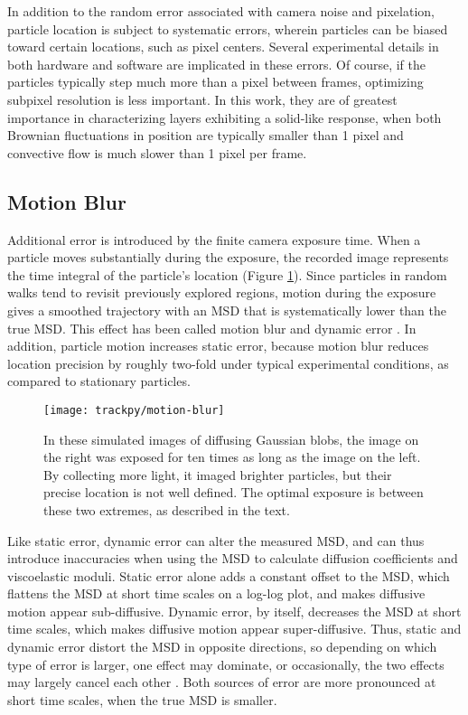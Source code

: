 In addition to the random error associated with camera noise and pixelation, particle location is subject to systematic errors, wherein particles can be biased toward certain locations, such as pixel centers. Several experimental details in both hardware and software are implicated in these errors\cite{Crocker2007}. Of course, if the particles typically step much more than a pixel between frames, optimizing subpixel resolution is less important. In this work, they are of greatest importance in characterizing layers exhibiting a solid-like response, when both Brownian fluctuations in position are typically smaller than 1 pixel and convective flow is much slower than 1 pixel per frame.

\subsection{Motion Blur}

Additional error is introduced by the finite  camera exposure time. When a particle moves substantially during the exposure, the recorded image represents the time integral of the particle's location (Figure \ref{fig:motion-blur}). Since particles in random walks tend to revisit previously explored regions, motion during the exposure gives a smoothed trajectory with an MSD that is systematically lower than the true MSD\cite{Crocker2007,Berg1971a}. This effect has been called motion blur and dynamic error \cite{Savin2005}. In addition, particle motion increases static error, because motion blur reduces location precision by roughly two-fold under typical experimental conditions, as compared to stationary particles\cite{Deschout2012}.

   \begin{figure}
    \centering
    \texttt{[image: trackpy/motion-blur]}
    \caption{\label{fig:motion-blur}In these simulated images of diffusing Gaussian blobs, the image on the right was exposed for ten times as long as the image on the left. By collecting more light, it imaged brighter particles, but their precise location is not well defined. The optimal exposure is between these two extremes, as described in the text.}
    \end{figure}

Like static error, dynamic error can alter the measured MSD, and can thus introduce inaccuracies when using the MSD to calculate diffusion coefficients and viscoelastic moduli. Static error alone adds a constant offset to the MSD, which flattens the MSD at short time scales on a log-log plot, and makes diffusive motion appear sub-diffusive\cite{Martin2002a}. Dynamic error, by itself, decreases the MSD at short time scales, which makes diffusive motion appear super-diffusive. Thus, static and dynamic error distort the MSD in opposite directions, so depending on which type of error is larger, one effect may dominate, or occasionally, the two effects may largely cancel each other \cite{Savin2005}. Both sources of error are more pronounced at short time scales, when the true MSD is smaller.

